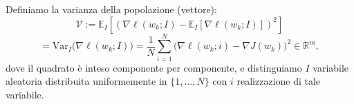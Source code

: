 \documentclass[a4paper,12pt]{article}
\newcommand{\Var}{\mathrm{Var}}
\begin{document}
Definiamo la varianza della popolazione (vettore):
\[
\mathcal{V}
:= \mathbb{E}_{I}\left[ \left( \nabla \ell(w_k; I) - \mathbb{E}_{I}[\nabla \ell(w_k; I)] \right)^{2} \right] \]\[
= \Var_{I}\bigl(\nabla \ell(w_k; I)\bigr) 
= \frac{1}{N}\sum_{i=1}^{N}\bigl(\nabla \ell(w_k; i) - \nabla J(w_k)\bigr)^2 \in \mathbb{R}^m,
\]
dove il quadrato è inteso componente per componente, e distinguiamo $I$ variabile aleatoria distribuita uniformemente in $\{1,\dots,N\}$ con $i$ realizzazione di tale variabile.

\end{document}
